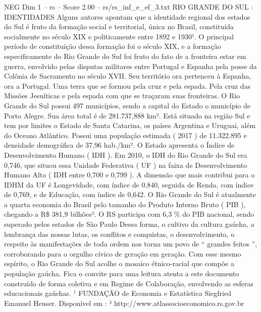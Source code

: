 \begin{textsample}{NEG Dim 1 – rs – Score 2.00 – rs/rs\_inf\_e\_ef\_3.txt}  \label{ex:f1_neg_082}
RIO GRANDE DO SUL : IDENTIDADES Alguns autores apontam que a identidade regional dos estados do Sul é fruto da formação social e territorial, única no Brasil, constituída socialmente no século XIX e politicamente entre 1892 e 1930¹.
O principal período de constituição dessa formação foi o século XIX, e a formação especificamente do Rio Grande do Sul foi fruto do fato de a fronteira estar em guerra, envolvido pelas disputas militares entre Portugal e Espanha pela posse da Colônia de Sacramento no século XVII.
Seu território ora pertenceu à Espanha, ora a Portugal.
Uma terra que se formou pela cruz e pela espada.
Pela cruz das Missões Jesuíticas e pela espada com que se traçaram suas fronteiras.
O Rio Grande do Sul possui 497 municípios, sendo a capital do Estado o município de Porto Alegre.
Sua área total é de 281.737,888 km².
Está situado na região Sul e tem por limites o Estado de Santa Catarina, os países Argentina e Uruguai, além do Oceano Atlântico.
Possui uma população estimada ( 2017 ) de 11.322.895 e densidade demográfica de 37,96 hab./km².
O Estado apresenta o Índice de Desenvolvimento Humano ( IDH ).
Em 2010, o IDH do Rio Grande do Sul era 0,746, que situou essa Unidade Federativa ( UF ) na faixa de Desenvolvimento Humano Alto ( IDH entre 0,700 e 0,799 ).
A dimensão que mais contribui para o IDHM da UF é Longevidade, com índice de 0,840, seguida de Renda, com índice de 0,769, e de Educação, com índice de 0,642.
O Rio Grande do Sul é atualmente a quarta economia do Brasil pelo tamanho do Produto Interno Bruto ( PIB ), chegando a R\$ 381,9 bilhões².
O RS participa com 6,3 \% do PIB nacional, sendo superado pelos estados de São Paulo Dessa forma, o cultivo da cultura gaúcha, a lembrança das nossas lutas, os conflitos e conquistas, o desenvolvimento, o respeito às manifestações de toda ordem nos torna um povo de “ grandes feitos ”, corroborando para o orgulho cívico de geração em geração.
Com esse mesmo espírito, o Rio Grande do Sul acolhe o mosaico étnico-racial que compõe a população gaúcha.
Fica o convite para uma leitura atenta a este documento construído de forma coletiva e em Regime de Colaboração, envolvendo as esferas educacionais gaúchas. ¹ FUNDAÇÃO de Economia e Estatística Siegfried Emanuel Heuser.
Disponível em : ² http://www.atlassocioeconomico.rs.gov.br

\end{textsample}
